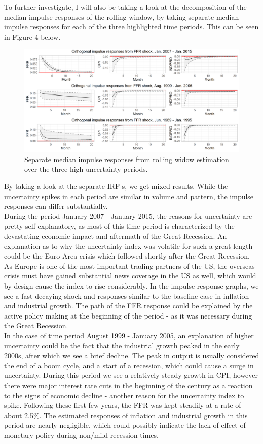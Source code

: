 \documentclass[12pt,a4paper]{article}
\begin{document}
To further investigate, I will also be taking a look at the decomposition of the median impulse responses of the rolling window, by taking separate median impulse responses for each of the three highlighted time periods. This can be seen in Figure 4 below.   
\begin{center}
\begin{figure}[h!]
	\includegraphics[width=0.9\linewidth]{irfplot2.png}
			\caption{Separate median impulse responses from rolling widow estimation over the three high-uncertainty periods.}
\end{figure}
\end{center}
By taking a look at the separate IRF-s, we get mixed results. While the uncertainty spikes in each period are similar in volume and pattern, the impulse responses can differ substantially.\\ 
\noindent During the period January 2007 - January 2015, the reasons for uncertainty are pretty self explanatory, as most of this time period is characterized by the devastating economic impact and aftermath of the Great Recession. An explanation as to why the uncertainty index was volatile for such a great length could be the Euro Area crisis which followed shortly after the Great Recession. As Europe is one of the most important trading partners of the US, the overseas crisis must have gained substantial news coverage in the US as well, which would by design cause the index to rise considerably. In the impulse response graphs, we see a fast decaying shock and responses similar to the baseline case in inflation and industrial growth. The path of the FFR response could be explained by the active policy making at the beginning of the period - as it was necessary during the Great Recession. \\
\noindent In the case of time period August 1999 - January 2005, an explanation of higher uncertainty could be the fact that the industrial growth peaked in the early 2000s, after which we see a brief decline. The peak in output is usually considered the end of a boom cycle, and a start of a recession, which could cause a surge in uncertainty. During this period we see a relatively steady growth in CPI, however there were major interest rate cuts in the beginning of the century as a reaction to the signs of economic decline - another reason for the uncertainty index to spike. Following these first few years, the FFR was kept steadily at a rate of about 2.5\%. The estimated responses of inflation and industrial growth in this period are nearly negligible, which could possibly indicate the lack of effect of monetary policy during non/mild-recession times. 
\end{document}
